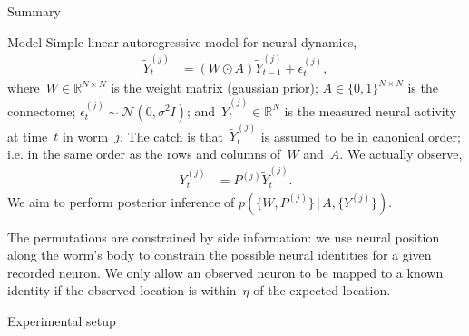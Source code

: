 \documentclass[final]{beamer}
\begin{document}
\begin{frame}[allowframebreaks]
\begin{minipage}[htp][1\textheight][t]{\textwidth}
\begin{columns}[t]
\begin{column}{.5\linewidth}
\begin{block}{Summary}
	 
	    \end{block}
	    
\begin{block}{Model}
\large Simple linear autoregressive
model for neural dynamics,
\begin{align}
  \widetilde{Y}_t^{(j)} &= (W \odot A) \widetilde{Y}_{t-1}^{(j)} + \epsilon_t^{(j)},
\end{align}
where~$W \in \mathbb{R}^{N \times N}$ is the weight matrix (gaussian prior);
$A \in \{0,1\}^{N \times N}$ is the connectome;
$\epsilon_t^{(j)} \sim \mathcal{N}(0, \sigma^2 I)$;
and~$\widetilde{Y}_t^{(j)} \in \mathbb{R}^N$ is the measured neural activity
at time~$t$ in worm~$j$.  The catch is that~$\widetilde{Y}_t^{(j)}$ is
assumed to be in canonical order; i.e. in the same order as the rows and
columns of~$W$ and~$A$. We actually observe,
\begin{align}
  Y_t^{(j)} &= P^{(j)} \widetilde{Y}_t^{(j)}.
\end{align}
We aim to perform posterior inference of $p(\{W,P^{(j)}\} \, | \, A, \{Y^{(j)}\})$.
\vspace{0.5cm}

The permutations are constrained by side
information: we use neural position along the worm's
body to constrain the possible neural identities for a given recorded
neuron. We only allow an observed neuron to be mapped to a known
identity if the observed location is within~$\eta$ of the expected
location.  

\end{block}

	 	             	    
\begin{block}{Experimental setup}


\end{block}
\end{column}
\end{columns}
\end{minipage}
\end{frame}
\end{document}
